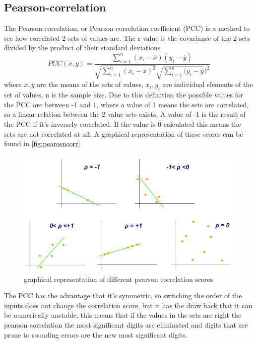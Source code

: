 \subsection{Pearson-correlation}
The Pearson correlation, or Pearson correlation coefficient (PCC) is a method to see how correlated 2 sets of values are. The r value is the covariance of the 2 sets divided by the product of their standard deviations $$PCC(x,y) =\frac{\sum_{i=1}^n (x_i-\overline{x})(y_i-\overline{y})}{\sqrt{\sum_{i=1}^n (x_i-\overline{x})^2}\sqrt{\sum_{i=1}^n(y_i-\overline{y}})^2}$$ where $\overline{x},  \overline{y}$ are the means of the sets of values, $x_i, y_i$ are individual elements of the set of values, n is the sample size. 
Due to this definition the possible values for the PCC are between -1 and 1, where a value of 1 means the sets are correlated, so a linear relation between the 2 value sets exists. A value of -1 is the result of the PCC if it's inversely correlated. 
If the value is 0 calculated this means the sets are not correlated at all. A graphical representation of these scores can be found in \autoref{fig:pearosncorr}
\begin{figure}[ht]
    \centering
    \includegraphics[width=0.7\linewidth]{Latex//sections//images/pearson correlation.png}
    \caption{graphical representation of different pearson correlation scores \cite{pearsoncorrimage}}
    
    \label{fig:pearosncorr}
\end{figure}

The PCC has the advantage that it's symmetric, so switching the order of the inputs does not change the correlation score, but it has the draw back that it can be numerically unstable, this means that if the values in the sets are right the pearson correlation the most significant digits are eliminated and digits that are prone to rounding errors are the new most significant digits. 
